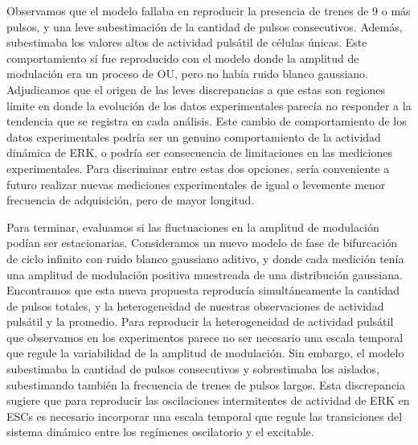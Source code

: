 \documentclass[./main.tex]{subfiles}
\begin{document}
Observamos que el modelo fallaba en reproducir la presencia de trenes de 9 o más pulsos, y una leve subestimación de la cantidad de pulsos consecutivos. Además, subestimaba los valores altos de actividad pulsátil de células únicas. Este comportamiento sí fue reproducido con el modelo donde la amplitud de modulación era un proceso de OU, pero no había ruido blanco gaussiano. Adjudicamos que el origen de las leves discrepancias a que estas son regiones límite en donde la evolución de los datos experimentales parecía no responder a la tendencia que se registra en cada análisis. Este cambio de comportamiento de los datos experimentales podría ser un genuino comportamiento de la actividad dinámica de ERK, o podría ser consecuencia de limitaciones en las mediciones experimentales. Para discriminar entre estas dos opciones, sería conveniente a futuro realizar nuevas mediciones experimentales de igual o levemente menor frecuencia de adquisición, pero de mayor longitud.


Para terminar, evaluamos si las fluctuaciones en la amplitud de modulación podían ser estacionarias. Consideramos un nuevo modelo de fase de bifurcación de ciclo infinito con ruido blanco gaussiano aditivo, y donde cada medición tenía una amplitud de modulación positiva muestreada de una distribución gaussiana. Encontramos que esta nueva propuesta reproducía simultáneamente la cantidad de pulsos totales, y la heterogeneidad de nuestras observaciones de actividad pulsátil y la promedio. Para reproducir la heterogeneidad de actividad pulsátil que observamos en los experimentos parece no ser necesario una escala temporal que regule la variabilidad de la amplitud de modulación. Sin embargo, el modelo subestimaba la cantidad de pulsos consecutivos y sobrestimaba los aislados, subestimando también la frecuencia de trenes de pulsos largos. Esta discrepancia sugiere que para reproducir las oscilaciones intermitentes de actividad de ERK en ESCs es necesario incorporar una escala temporal que regule las transiciones del sistema dinámico entre los regímenes oscilatorio y el excitable. 
\end{document}
